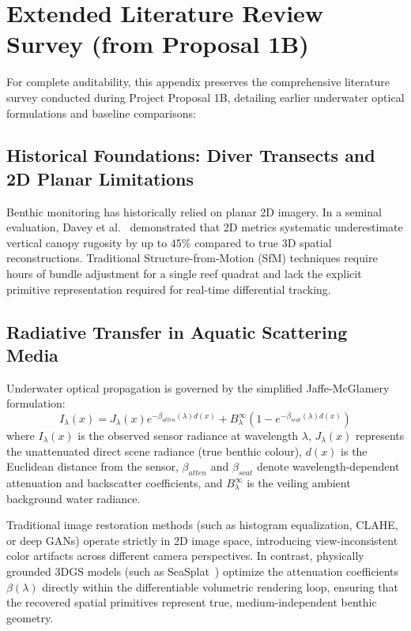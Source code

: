 \chapter{Extended Literature Review Survey (from Proposal 1B)}
\label{app:extended_lit_review}

For complete auditability, this appendix preserves the comprehensive literature survey conducted during Project Proposal 1B, detailing earlier underwater optical formulations and baseline comparisons:

\section{Historical Foundations: Diver Transects and 2D Planar Limitations}
Benthic monitoring has historically relied on planar 2D imagery. In a seminal evaluation, Davey et al.~\cite{davey2025review} demonstrated that 2D metrics systematic underestimate vertical canopy rugosity by up to 45\% compared to true 3D spatial reconstructions. Traditional Structure-from-Motion (SfM) techniques require hours of bundle adjustment for a single reef quadrat and lack the explicit primitive representation required for real-time differential tracking.

\section{Radiative Transfer in Aquatic Scattering Media}
Underwater optical propagation is governed by the simplified Jaffe-McGlamery formulation:
\begin{equation}
    I_\lambda(x) = J_\lambda(x) e^{-\beta_{atten}(\lambda) d(x)} + B_\lambda^\infty \left(1 - e^{-\beta_{scat}(\lambda) d(x)}\right)
    \label{eq:underwater_optical_model}
\end{equation}
where $I_\lambda(x)$ is the observed sensor radiance at wavelength $\lambda$, $J_\lambda(x)$ represents the unattenuated direct scene radiance (true benthic colour), $d(x)$ is the Euclidean distance from the sensor, $\beta_{atten}$ and $\beta_{scat}$ denote wavelength-dependent attenuation and backscatter coefficients, and $B_\lambda^\infty$ is the veiling ambient background water radiance. 

Traditional image restoration methods (such as histogram equalization, CLAHE, or deep GANs) operate strictly in 2D image space, introducing view-inconsistent color artifacts across different camera perspectives. In contrast, physically grounded 3DGS models (such as SeaSplat~\cite{11128502}) optimize the attenuation coefficients $\beta(\lambda)$ directly within the differentiable volumetric rendering loop, ensuring that the recovered spatial primitives represent true, medium-independent benthic geometry.
